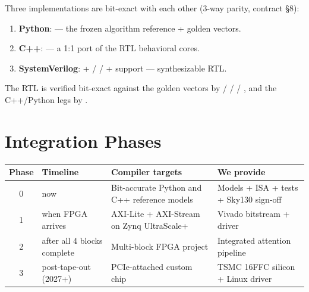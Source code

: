 \documentclass[11pt]{article}
\begin{document}
Three implementations are bit-exact with each other (3-way parity, contract \S8):
\begin{enumerate}
\item \textbf{Python}:  ---
      the frozen algorithm reference + golden vectors.
\item \textbf{C++}:  ---
      a 1:1 port of the RTL behavioral cores.
\item \textbf{SystemVerilog}:  + 
      /  /  + support --- synthesizable RTL.
\end{enumerate}

\noindent The RTL is verified bit-exact against the golden vectors by
 /  /  / , and the
C++/Python legs by .

\section{Integration Phases}
\label{sec:phases}

\begin{table}[ht]
\centering
\small
\renewcommand{\arraystretch}{1.2}
\begin{tabular}{@{}c p{3.0cm} p{4.0cm} p{5.0cm}@{}}
\toprule
Phase & Timeline & Compiler targets & We provide \\
\midrule
0 & now & Bit-accurate Python and C++ reference models & Models + ISA + tests + Sky130 sign-off \\
1 & when FPGA arrives & AXI-Lite + AXI-Stream on Zynq UltraScale+ & Vivado bitstream + driver \\
2 & after all 4 blocks complete & Multi-block FPGA project & Integrated attention pipeline \\
3 & post-tape-out (2027+) & PCIe-attached custom chip & TSMC 16FFC silicon + Linux driver \\
\bottomrule
\end{tabular}
\end{table}

\end{document}
